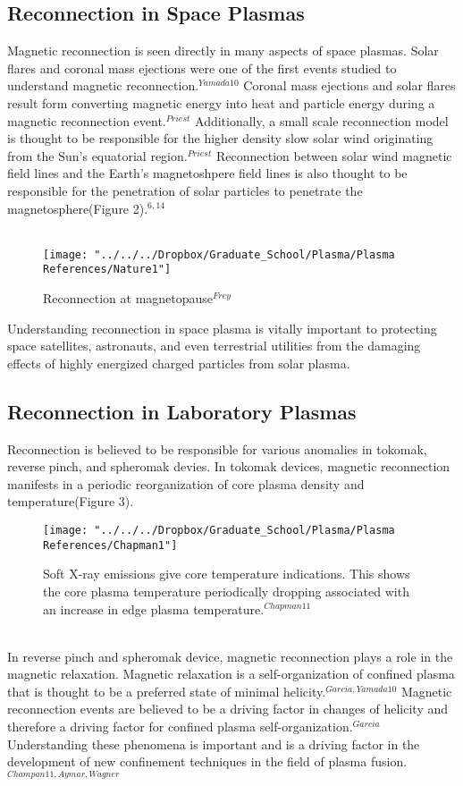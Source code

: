 \documentclass{article}
\begin{document}
\subsection{Reconnection in Space Plasmas}
Magnetic reconnection is seen directly in many aspects of space plasmas.  Solar flares and coronal mass ejections were one of the first events studied to understand magnetic reconnection.$^{Yamada10}$  Coronal mass ejections and solar flares result form converting magnetic energy into heat and particle energy during a magnetic reconnection event.$^{Priest}$  Additionally, a small scale reconnection model is thought to be responsible for the higher density slow solar wind originating from the Sun's equatorial region.$^{Priest}$  Reconnection between solar wind magnetic field lines and the Earth's magnetoshpere field lines is also thought to be responsible for the penetration of solar particles to penetrate the magnetosphere(Figure 2).$^{6,14}$\\\\\begin{figure}
\centering
\texttt{[image: "../../../Dropbox/Graduate\_School/Plasma/Plasma References/Nature1"]}
\caption{Reconnection at magnetopause$^{Frey}$}
\label{fig:Nature1}
\end{figure}
Understanding reconnection in space plasma is vitally important to protecting space satellites, astronauts, and even terrestrial utilities from the damaging effects of highly energized charged particles from solar plasma.
\subsection{Reconnection in Laboratory Plasmas}
Reconnection is believed to be responsible for various anomalies in tokomak, reverse pinch, and spheromak devies.  In tokomak devices, magnetic reconnection manifests in a periodic reorganization of core plasma density and temperature(Figure 3).  
\begin{figure}[p]
\centering
\texttt{[image: "../../../Dropbox/Graduate\_School/Plasma/Plasma References/Chapman1"]}
\caption{Soft X-ray emissions give core temperature indications. This shows the core plasma temperature periodically dropping associated with an increase in edge plasma temperature.$^{Chapman11}$}
\label{fig:Chapman1}
\end{figure}
\\In reverse pinch and spheromak device, magnetic reconnection plays a role in the magnetic relaxation.  Magnetic relaxation is a self-organization of confined plasma that is thought to be a preferred state of minimal helicity.$^{Garcia,Yamada10}$  Magnetic reconnection events are believed to be a driving factor in changes of helicity and therefore a driving factor for confined plasma self-organization.$^{Garcia}$  Understanding these phenomena is important and is a driving factor in the development of new confinement techniques in the field of plasma fusion.$^{Champan11, Aymar, Wagner}$
\end{document}
